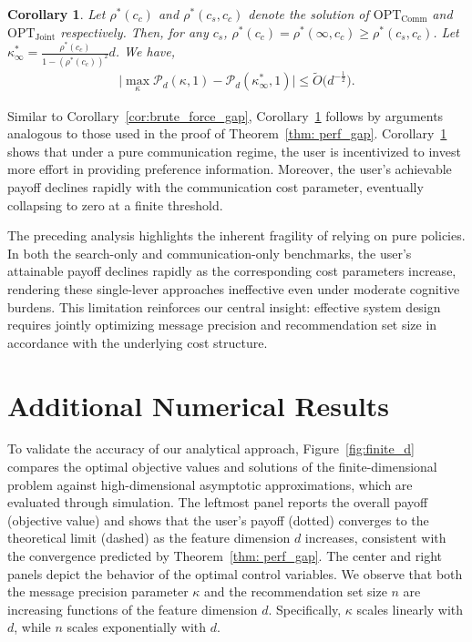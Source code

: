 \documentclass[12pt]{article}
\newtheorem{corollary}[theorem]{Corollary}
\theoremstyle{definition}
\theoremstyle{remark}
\begin{document}
\begin{corollary}
\label{cor:comm_gap}
Let $\rho^*(c_c)$ and $\rho^*(c_s,c_c)$ denote the solution of $\text{OPT}_{\text{Comm}}$ and $\text{OPT}_{\text{Joint}}$ respectively. Then, for any $c_s$, $\rho^*(c_c) = \rho^*(\infty,c_c) \geq \rho^*(c_s,c_c)$. Let $\kappa^*_\infty = \frac{\rho^*(c_c)}{1-(\rho^*(c_c))^2}d$. We have,
\begin{align*}
    \big| \max_{\kappa} \mathcal{P}_d(\kappa,1) - \mathcal{P}_d(\kappa^*_\infty,1) \big| \leq \tilde{O}\big(d^{-\frac{1}{2}}\big).
\end{align*}
\end{corollary}
Similar to Corollary~\ref{cor:brute_force_gap}, Corollary~\ref{cor:comm_gap} follows by arguments analogous to those used in the proof of Theorem~\ref{thm: perf_gap}. Corollary~\ref{cor:comm_gap} shows that under a pure communication regime, the user is incentivized to invest more effort in providing preference information. Moreover, the user’s achievable payoff declines rapidly with the communication cost parameter, eventually collapsing to zero at a finite threshold.

The preceding analysis highlights the inherent fragility of relying on pure policies. In both the search-only and communication-only benchmarks, the user’s attainable payoff declines rapidly as the corresponding cost parameters increase, rendering these single-lever approaches ineffective even under moderate cognitive burdens. This limitation reinforces our central insight: effective system design requires jointly optimizing message precision and recommendation set size in accordance with the underlying cost structure.

\section{Additional Numerical Results}

To validate the accuracy of our analytical approach, Figure~\ref{fig:finite_d} compares the optimal objective values and solutions of the finite-dimensional problem against high-dimensional asymptotic approximations, which are evaluated through simulation. The leftmost panel reports the overall payoff (objective value) and shows that the user’s payoff (dotted) converges to the theoretical limit (dashed) as the feature dimension $d$ increases, consistent with the convergence predicted by Theorem~\ref{thm: perf_gap}. The center and right panels depict the behavior of the optimal control variables. We observe that both the message precision parameter $\kappa$ and the recommendation set size $n$ are increasing functions of the feature dimension $d$. Specifically, $\kappa$ scales linearly with $d$, while $n$ scales exponentially with $d$.
\end{document}
